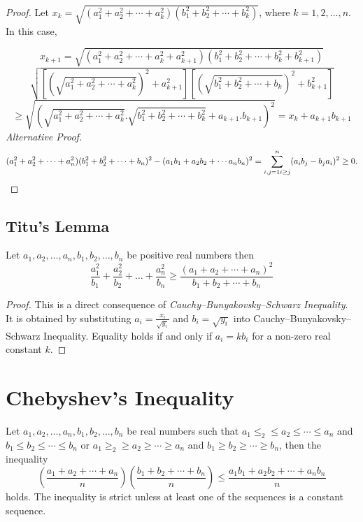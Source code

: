 \begin{proof}
  Let $x_k = \sqrt{(a_1^2 + a_2^2 + \cdots + a_k^2)(b_1^2 + b_2^2 + \cdots + b_k^2)}$, where $k = 1, 2, \ldots, n$.
  In this case,

  $$x_{k + 1} = \sqrt{(a_1^2 + a_2^2 + \cdots + a_k^2 + a_{k + 1}^2)(b_1^2 + b_2^2 + \cdots + b_k^2 + b_{k + 1}^2)}$$
  $$\sqrt{\left[\left(\sqrt{a_1^2 + a_2^2 + \cdots + a_k^2}\right)^2 + a_{k + 1}^2\right]\left[\left(\sqrt{b_1^2 + b_2^2 + \cdots +
        b_k}\right)^2 + b_{k + 1}^2\right]}$$
  $$\geq \sqrt{\left(\sqrt{a_1^2 + a_2^2 + \cdots + a_k^2}.\sqrt{b_1^2 + b_2^2 + \cdots + b_k^2} + a_{k + 1}.b_{k + 1}\right)^2} =
  x_k + a_{k + 1}b_{k + 1}$$
  {\it Alternative Proof.}
  $$(a_1^2 + a_2^2 + \cdots + a_n^2)(b_1^2 + b_2^2 + \cdots + b_n)^2 - (a_1b_1 + a_2b_2 + \cdots a_nb_n)^2 =
  \sum_{i,j=1\\i\geq j}^n(a_ib_j - b_ja_i)^2\geq 0.$$
\end{proof}

\subsection{Titu's Lemma}
\begin{lemma}
  Let $a_1, a_2, \ldots, a_n, b_1, b_2, \ldots, b_n$ be positive real numbers then
  \begin{equation}
  \frac{a_1^2}{b_1} + \frac{a_2^2}{b_2} + \ldots
    + \frac{a_n^2}{b_n} \geq \frac{(a_1 + a_2 + \cdots + a_n)^2}{b_1 + b_2 + \cdots + b_n}
  \end{equation}
\end{lemma}

\begin{proof}
  This is a direct consequence of \textit{Cauchy–Bunyakovsky–Schwarz Inequality}. It is obtained by substituting $a_i =
  \frac{x_i}{\sqrt{y_i}}$ and $b_i = \sqrt{y_i}$ into Cauchy–Bunyakovsky–Schwarz Inequality. Equality holds if and only if $a_i =
  kb_i$ for a non-zero real constant $k$.
\end{proof}

\section{Chebyshev's Inequality}
\begin{theorem}
  Let $a_1, a_2, \ldots, a_n, b_1, b_2, \ldots, b_n$ be real numbers such that  $a_1\leq _2\leq a_2\leq \cdots\leq a_n$ and $b_1\leq
  b_2\leq\cdots\leq b_n$ or $a_1\geq _2\geq a_2\geq \cdots\geq a_n$ and $b_1\geq b_2\geq\cdots\geq b_n$, then the inequality
  \begin{equation}
    \left(\frac{a_1 + a_2 + \cdots + a_n}{n}\right)\left(\frac{b_1 + b_2 + \cdots + b_n}{n}\right)\leq \frac{a_1b_1 + a_2b_2 +
      \cdots + a_nb_n}{n}
  \end{equation}
  holds. The inequality is strict unless at least one of the sequences is a constant sequence.
\end{theorem}

